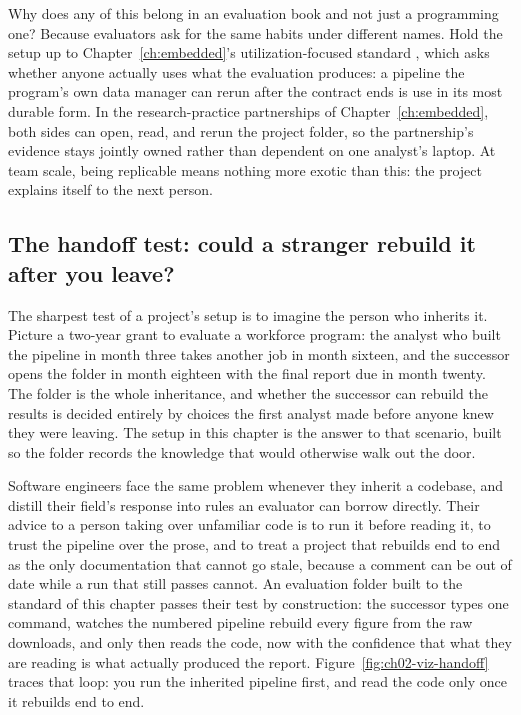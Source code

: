 \documentclass[
    a4paper,
    fontsize=10pt,
    twoside=true,
    numbers=noenddot,
]{kaobook}
\begin{document}
Why does any of this belong in an evaluation book and not just a programming one? Because evaluators ask for the same habits under different names. Hold the setup up to Chapter~\ref{ch:embedded}'s utilization-focused standard \parencite{patton2008utilization}, which asks whether anyone actually uses what the evaluation produces: a pipeline the program's own data manager can rerun after the contract ends is use in its most durable form. In the research-practice partnerships of Chapter~\ref{ch:embedded}, both sides can open, read, and rerun the project folder, so the partnership's evidence stays jointly owned rather than dependent on one analyst's laptop. At team scale, being replicable means nothing more exotic than this: the project explains itself to the next person.

\subsection{The handoff test: could a stranger rebuild it after you leave?}\label{sec:ch02-handoff}
The sharpest test of a project's setup is to imagine the person who inherits it. Picture a two-year grant to evaluate a workforce program: the analyst who built the pipeline in month three takes another job in month sixteen, and the successor opens the folder in month eighteen with the final report due in month twenty. The folder is the whole inheritance, and whether the successor can rebuild the results is decided entirely by choices the first analyst made before anyone knew they were leaving. The setup in this chapter is the answer to that scenario, built so the folder records the knowledge that would otherwise walk out the door.

Software engineers face the same problem whenever they inherit a codebase, and \textcite{pilgrim2023code} distill their field's response into rules an evaluator can borrow directly. Their advice to a person taking over unfamiliar code is to run it before reading it, to trust the pipeline over the prose, and to treat a project that rebuilds end to end as the only documentation that cannot go stale, because a comment can be out of date while a run that still passes cannot. An evaluation folder built to the standard of this chapter passes their test by construction: the successor types one command, watches the numbered pipeline rebuild every figure from the raw downloads, and only then reads the code, now with the confidence that what they are reading is what actually produced the report. Figure~\ref{fig:ch02-viz-handoff} traces that loop: you run the inherited pipeline first, and read the code only once it rebuilds end to end.
\end{document}
